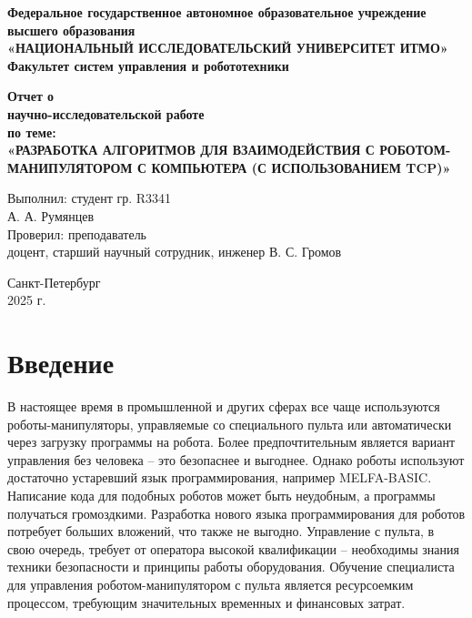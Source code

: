 \documentclass[a4paper,14pt]{extarticle}
\begin{document}
\begin{titlepage}
    \begin{center}
        \textbf{Федеральное государственное автономное образовательное учреждение высшего образования}\\
        \textbf{«НАЦИОНАЛЬНЫЙ ИССЛЕДОВАТЕЛЬСКИЙ УНИВЕРСИТЕТ ИТМО»}\medskip\\
        \textbf{Факультет систем управления и робототехники}
        \vfill

        {\large\bfseries Отчет о}\\
        {\large\bfseries научно-исследовательской работе}\medskip\\
        {\large\bfseries по теме:}\\
        {\large\bfseries «РАЗРАБОТКА АЛГОРИТМОВ ДЛЯ ВЗАИМОДЕЙСТВИЯ С РОБОТОМ-МАНИПУЛЯТОРОМ С КОМПЬЮТЕРА (С ИСПОЛЬЗОВАНИЕМ TCP)»}
        \vfill

        \begin{flushright}
            Выполнил: студент гр. R3341\\
            А. А. Румянцев\medskip\\

            Проверил: преподаватель\\
            доцент, старший научный сотрудник, инженер В. С. Громов
        \end{flushright}

        \vfill

        Санкт-Петербург\\
        2025 г.
    \end{center}
\end{titlepage}

\setcounter{page}{2}
\tableofcontents
\newpage


\section*{Введение}
\setcounter{section}{0}
В настоящее время в промышленной и других сферах все чаще
используются роботы-манипуляторы, управляемые
со специального пульта или автоматически
через загрузку программы на робота.
Более предпочтительным является вариант
управления без человека -- это безопаснее
и выгоднее. Однако роботы используют
достаточно устаревший язык программирования,
например MELFA-BASIC. Написание кода
для подобных роботов может быть неудобным,
а программы получаться громоздкими.
Разработка нового языка программирования
для роботов потребует больших вложений,
что также не выгодно. Управление с пульта,
в свою очередь,
требует от оператора высокой квалификации --
необходимы знания техники безопасности и
принципы работы оборудования. Обучение
специалиста для управления роботом-манипулятором с пульта
является ресурсоемким процессом, требующим
значительных временных и финансовых затрат.
\end{document}
